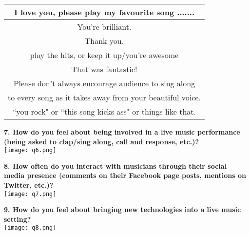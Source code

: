 \begin{center}
\begin{tabular}{|c|}
\hline
I love you, please play my favourite song .......\\ \hline
You're brilliant.\\ \hline
Thank you.\\ \hline
play the hits, or keep it up/you're awesome\\ \hline
That was fantastic!\\ \hline
Please don't always encourage audience to sing along\\
to every song as it takes away from your beautiful voice.\\ \hline
``you rock" or ``this song kicks ass" or things like that.\\
\hline
\end{tabular}

\vspace{1cm}

\textbf{7. How do you feel about being involved in a live music performance (being asked to clap/sing along, call and response, etc.)?}\\
\texttt{[image: q6.png]}

\vspace{0.5cm}

\textbf{8. How often do you interact with musicians through their social media presence (comments on their Facebook page posts, mentions on Twitter, etc.)?}\\
\texttt{[image: q7.png]}

\vspace{0.5cm}

\textbf{9. How do you feel about bringing new technologies into a live music setting?}\\
\texttt{[image: q8.png]}

\end{center}